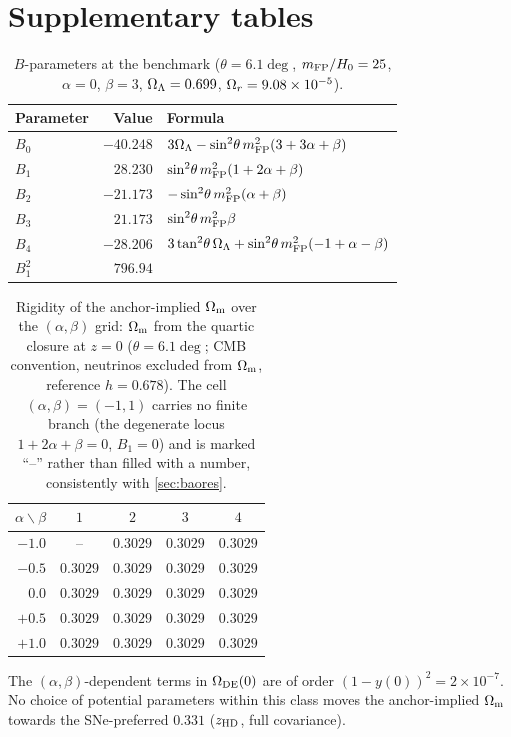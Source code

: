 \appendix
\setcounter{table}{0}

\section{Supplementary tables}\label{app:tables}

\begin{table}[h]
\centering\small
\caption{$B$-parameters at the benchmark ($\theta=6.1\deg$, $m_{\mathrm{FP}}/H_0=25$, $\alpha=0$, $\beta=3$, $\Omega_{\Lambda}=0.699$, $\Omega_{r}=9.08\times10^{-5}$).}\label{tab:A1}
\begin{tabular}{@{}lrl@{}}
\toprule
Parameter & Value & Formula\\
\midrule
$B_0$ & $-40.248$ & $3\Omega_{\Lambda}-\sin^2\!\theta\,m_{\mathrm{FP}}^2(3+3\alpha+\beta)$\\
$B_1$ & $28.230$ & $\sin^2\!\theta\,m_{\mathrm{FP}}^2(1+2\alpha+\beta)$\\
$B_2$ & $-21.173$ & $-\sin^2\!\theta\,m_{\mathrm{FP}}^2(\alpha+\beta)$\\
$B_3$ & $21.173$ & $\sin^2\!\theta\,m_{\mathrm{FP}}^2\beta$\\
$B_4$ & $-28.206$ & $3\tan^2\!\theta\,\Omega_{\Lambda}+\sin^2\!\theta\,m_{\mathrm{FP}}^2(-1+\alpha-\beta)$\\
$B_1^2$ & $796.94$ & \\
\bottomrule
\end{tabular}
\end{table}

\begin{table}[h]
\centering\small
\caption{Rigidity of the anchor-implied $\Omega_{\mathrm m}$ over the $(\alpha,\beta)$ grid: $\Omega_{\mathrm m}$ from the quartic closure at $z=0$ ($\theta=6.1\deg$; CMB convention, neutrinos excluded from $\Omega_{\mathrm m}$, reference $h=0.678$). The cell $(\alpha,\beta)=(-1,1)$ carries no finite branch (the degenerate locus $1+2\alpha+\beta=0$, $B_1=0$) and is marked ``--'' rather than filled with a number, consistently with \cref{sec:baores}.}\label{tab:A1b}
\begin{tabular}{@{}rcccc@{}}
\toprule
$\alpha\backslash\beta$ & $1$ & $2$ & $3$ & $4$\\
\midrule
$-1.0$ & -- & $0.3029$ & $0.3029$ & $0.3029$\\
$-0.5$ & $0.3029$ & $0.3029$ & $0.3029$ & $0.3029$\\
$0.0$ & $0.3029$ & $0.3029$ & $0.3029$ & $0.3029$\\
$+0.5$ & $0.3029$ & $0.3029$ & $0.3029$ & $0.3029$\\
$+1.0$ & $0.3029$ & $0.3029$ & $0.3029$ & $0.3029$\\
\bottomrule
\end{tabular}
\end{table}
The $(\alpha,\beta)$-dependent terms in $\Omega_{\mathrm{DE}}(0)$ are of order $(1-y(0))^2=2\times10^{-7}$. No choice of potential parameters within this class moves the anchor-implied $\Omega_{\mathrm m}$ towards the SNe-preferred $0.331$ ($z_{\rm HD}$, full covariance).

